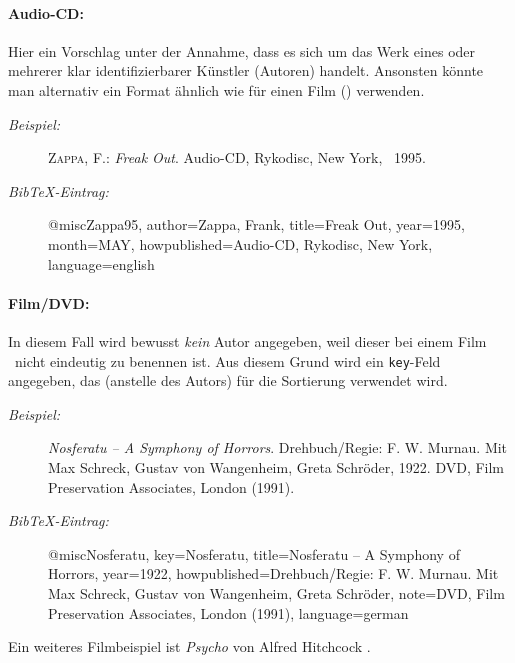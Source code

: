%

\paragraph{Audio-CD:} Hier ein Vorschlag unter der Annahme, dass es sich um das Werk eines oder mehrerer klar identifizierbarer Künstler (Autoren) handelt. Ansonsten könnte man alternativ ein Format ähnlich wie für einen Film (\su) verwenden.\nocite{Zappa95}
%
\begin{description}
\item[\it Beispiel:] \hfill\break
\textsc{Zappa, F.}: \emph{Freak Out}.
\newblock Audio-CD, Rykodisc, New York, \ 1995.
%
\item[\it BibTeX-Eintrag:] \mbox{} \par 
\begin{GenericCode}
@misc{Zappa95,
  author={Zappa, Frank},
  title={Freak Out},
  year={1995},
  month=MAY,
  howpublished={Audio-CD, Rykodisc, New York},
  language={english}
}
\end{GenericCode}
\end{description}


\paragraph{Film/DVD:} In diesem Fall wird bewusst \emph{kein} Autor angegeben, weil dieser bei einem Film \ia\ nicht eindeutig zu benennen ist. Aus diesem Grund wird ein \texttt{key}-Feld angegeben, das (anstelle des Autors) für die Sortierung verwendet wird.\nocite{Nosferatu}
%
\begin{description}
\item[\it Beispiel:] \hfill\break
\emph{Nosferatu -- A Symphony of Horrors}.
\newblock Drehbuch/Regie: F. W. Murnau. Mit Max Schreck, Gustav von Wangenheim,
  Greta Schröder, 1922.
\newblock DVD, Film Preservation Associates, London (1991).
\item[\it BibTeX-Eintrag:] \mbox{}\par
\begin{GenericCode}
@misc{Nosferatu,
  key={Nosferatu},
  title={Nosferatu -- A Symphony of Horrors},
  year={1922},
  howpublished={Drehbuch/Regie: F. W. Murnau. 
  Mit Max Schreck, Gustav von Wangenheim, Greta Schröder},
  note={DVD, Film Preservation Associates, London (1991)},
  language={german}
}
\end{GenericCode}
\end{description}
Ein weiteres Filmbeispiel ist \emph{Psycho} von Alfred Hitchcock \cite{Psycho}.


